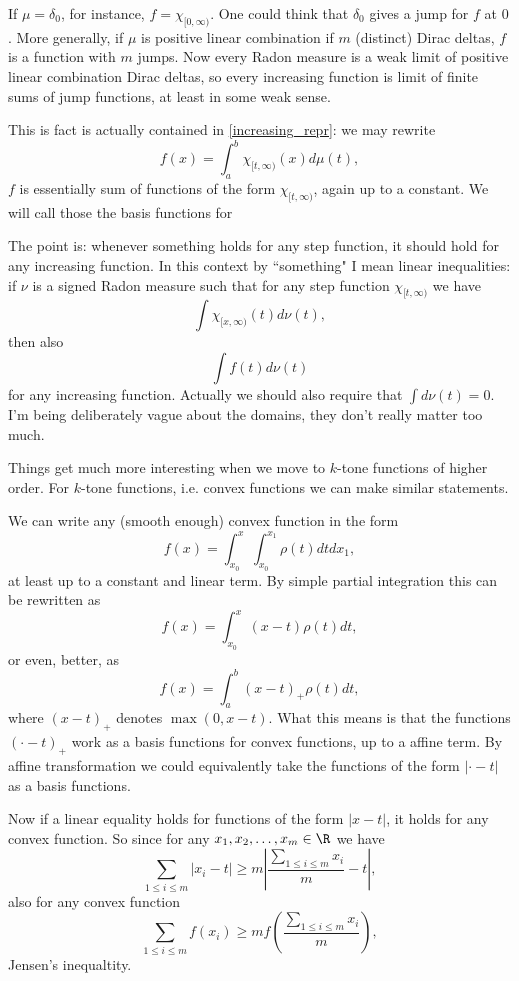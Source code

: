 If $\mu = \delta_{0}$, for instance, $f = \chi_{[0, \infty)}$. One could think that $\delta_{0}$ gives a jump for $f$ at $0$. More generally, if $\mu$ is positive linear combination if $m$ (distinct) Dirac deltas, $f$ is a function with $m$ jumps. Now every Radon measure is a weak limit of positive linear combination Dirac deltas, so every increasing function is limit of finite sums of jump functions, at least in some weak sense.

This is fact is actually contained in \ref{increasing_repr}: we may rewrite
\[
	f(x) = \int_{a}^{b} \chi_{[t, \infty)}(x)d\mu(t),
\]
$f$ is essentially sum of functions of the form $\chi_{[t, \infty)}$, again up to a constant. We will call those the basis functions for

The point is: whenever something holds for any step function, it should hold for any increasing function. In this context by ``something" I mean linear inequalities: if $\nu$ is a signed Radon measure such that for any step function $\chi_{[t, \infty)}$ we have
\[
	\int \chi_{[x, \infty)}(t) d \nu(t),
\]
then also
\[
	\int f(t) d \nu(t)
\]
for any increasing function. Actually we should also require that $\int d \nu(t) = 0$. I'm being deliberately vague about the domains, they don't really matter too much.

Things get much more interesting when we move to $k$-tone functions of higher order. For $k$-tone functions, i.e. convex functions we can make similar statements.

We can write any (smooth enough) convex function in the form
\[
	f(x) = \int_{x_{0}}^{x} \int_{x_{0}}^{x_{1}} \rho(t) dt dx_{1},
\]
at least up to a constant and linear term. By simple partial integration this can be rewritten as
\[
	f(x) = \int_{x_{0}}^{x} (x - t) \rho(t) d t,
\]
or even, better, as
\[
	f(x) = \int_{a}^{b} (x - t)_{+} \rho(t) dt,
\]
where $(x - t)_{+}$ denotes $\max(0, x - t)$. What this means is that the functions $(\cdot - t)_{+}$ work as a basis functions for convex functions, up to a affine term. By affine transformation we could equivalently take the functions of the form $|\cdot - t|$ as a basis functions.

Now if a linear equality holds for functions of the form $|x - t|$, it holds for any convex function. So since for any $x_{1}, x_{2}, \ldots, x_{m} \in \R$ we have
\[
	\sum_{1 \leq i \leq m} |x_{i} - t| \geq m |\frac{\sum_{1 \leq i \leq m} x_{i}}{m} - t|,
\]
also for any convex function
\[
	\sum_{1 \leq i \leq m} f(x_{i}) \geq m f\left(\frac{\sum_{1 \leq i \leq m} x_{i}}{m}\right),
\]
Jensen's inequaltity.

